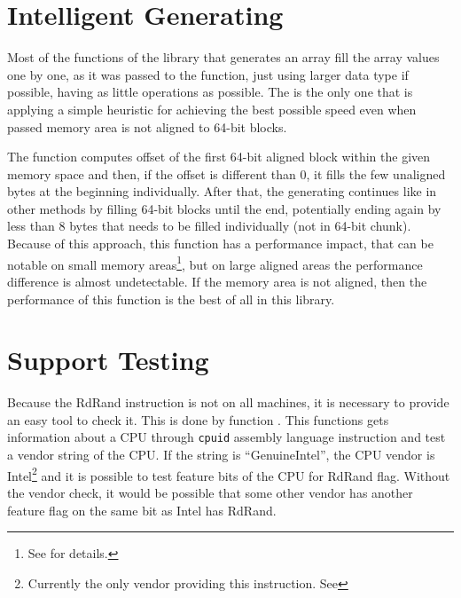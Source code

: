\section{Intelligent Generating}
Most of the functions of the library that generates an array fill the array values one by one, as it was passed to the function, just using larger data type if possible, having as little operations as possible. The  is the only one that is applying a simple heuristic for achieving the best possible speed even when passed memory area is not aligned to 64-bit blocks.

The function computes offset of the first 64-bit aligned block within the given memory space and then, if the offset is different than 0, it fills the few unaligned bytes at the beginning individually. After that, the generating continues like in other methods by filling 64-bit blocks until the end, potentially ending again by less than 8 bytes that needs to be filled individually (not in 64-bit chunk). Because of this approach, this function has a performance impact, that can be notable on small memory areas\footnote{See  for details.}, but on large aligned areas the performance difference is almost undetectable. If the memory area is not aligned, then the performance of this function is the best of all in this library.


\section{Support Testing}
Because the RdRand instruction is not on all machines, it is necessary to provide an easy tool to check it. This is done by function . This functions gets information about a CPU through {\tt cpuid} assembly language instruction and test a vendor string of the CPU. If the string is ``GenuineIntel'', the CPU vendor is Intel\footnote{Currently the only vendor providing this instruction. See } and it is possible to test feature bits of the CPU for RdRand flag. Without the vendor check, it would be possible that some other vendor has another feature flag on the same bit as Intel has RdRand.



